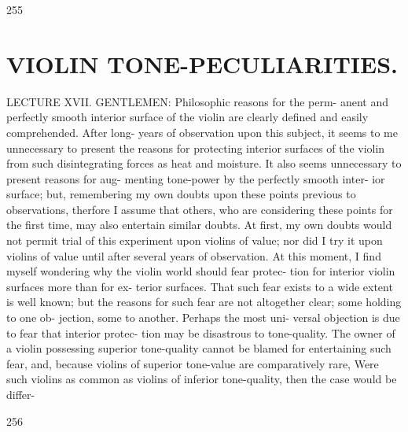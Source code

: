 \documentclass{article}
\begin{document}
255

\section*{VIOLIN TONE-PECULIARITIES.}
LECTURE XVII. GENTLEMEN: Philosophic reasons for the perm- anent and perfectly smooth interior surface of the violin are clearly defined and easily comprehended. After long- years of observation upon this subject, it seems to me unnecessary to present the reasons for protecting interior surfaces of the violin from such disintegrating forces as heat and moisture. It also seems unnecessary to present reasons for aug- menting tone-power by the perfectly smooth inter- ior surface; but, remembering my own doubts upon these points previous to observations, therfore I assume that others, who are considering these points for the first time, may also entertain similar doubts. At first, my own doubts would not permit trial of this experiment upon violins of value; nor did I try it upon violins of value until after several years of observation. At this moment, I find myself wondering why the violin world should fear protec- tion for interior violin surfaces more than for ex- terior surfaces. That such fear exists to a wide extent is well known; but the reasons for such fear are not altogether clear; some holding to one ob- jection, some to another. Perhaps the most uni- versal objection is due to fear that interior protec- tion may be disastrous to tone-quality. The owner of a violin possessing superior tone-quality cannot be blamed for entertaining such fear, and, because violins of superior tone-value are comparatively rare, Were such violins as common as violins of inferior tone-quality, then the case would be differ-

256
\end{document}
